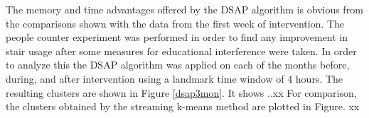 

The memory and time advantages offered by the DSAP algorithm is obvious from the comparisons shown with the data from the first week of intervention. The people counter experiment was performed in order to find any improvement in stair usage after some measures for educational interference were taken. In order to analyze this the DSAP algorithm was applied on each of the months before, during, and after intervention using a landmark time window of 4 hours. The resulting clusters are shown in Figure \ref{dsap3mon}. It shows ..xx
For comparison, the clusters obtained by the streaming k-means method are plotted in Figure. xx


